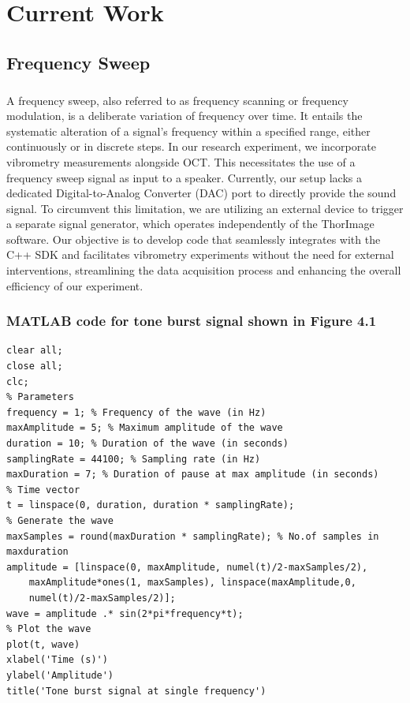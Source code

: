 \chapter{Current Work}
\section{Frequency Sweep}
\paragraph{}
A frequency sweep, also referred to as frequency scanning or frequency modulation, is a deliberate variation of frequency over time. It entails the systematic alteration of a signal's frequency within a specified range, either continuously or in discrete steps. In our research experiment, we incorporate vibrometry measurements alongside OCT. This necessitates the use of a frequency sweep signal as input to a speaker. Currently, our setup lacks a dedicated Digital-to-Analog Converter (DAC) port to directly provide the sound signal. To circumvent this limitation, we are utilizing an external device to trigger a separate signal generator, which operates independently of the ThorImage software. Our objective is to develop code that seamlessly integrates with the C++ SDK and facilitates vibrometry experiments without the need for external interventions, streamlining the data acquisition process and enhancing the overall efficiency of our experiment.

\subsection*{MATLAB code for tone burst signal shown in Figure 4.1}
\begin{verbatim}
clear all;
close all;
clc;
% Parameters
frequency = 1; % Frequency of the wave (in Hz)
maxAmplitude = 5; % Maximum amplitude of the wave
duration = 10; % Duration of the wave (in seconds)
samplingRate = 44100; % Sampling rate (in Hz)
maxDuration = 7; % Duration of pause at max amplitude (in seconds)
% Time vector
t = linspace(0, duration, duration * samplingRate);
% Generate the wave
maxSamples = round(maxDuration * samplingRate); % No.of samples in maxduration
amplitude = [linspace(0, maxAmplitude, numel(t)/2-maxSamples/2), 
    maxAmplitude*ones(1, maxSamples), linspace(maxAmplitude,0, 
    numel(t)/2-maxSamples/2)];
wave = amplitude .* sin(2*pi*frequency*t);
% Plot the wave
plot(t, wave)
xlabel('Time (s)')
ylabel('Amplitude')
title('Tone burst signal at single frequency')
\end{verbatim}

